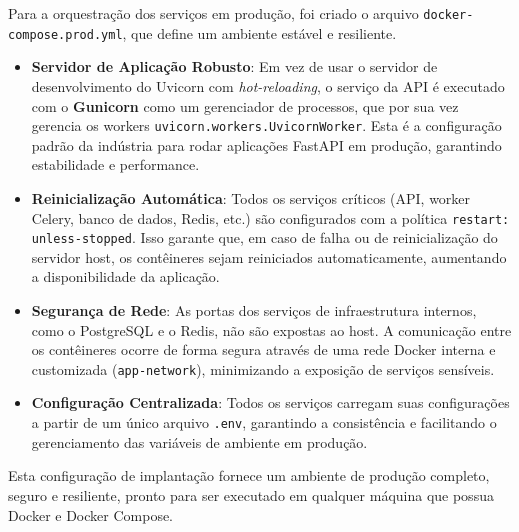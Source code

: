 Para a orquestração dos serviços em produção, foi criado o arquivo \texttt{docker-compose.prod.yml}, que define um ambiente estável e resiliente.

\begin{itemize}
    \item \textbf{Servidor de Aplicação Robusto}: Em vez de usar o servidor de desenvolvimento do Uvicorn com \textit{hot-reloading}, o serviço da API é executado com o \textbf{Gunicorn} como um gerenciador de processos, que por sua vez gerencia os workers \texttt{uvicorn.workers.UvicornWorker}. Esta é a configuração padrão da indústria para rodar aplicações FastAPI em produção, garantindo estabilidade e performance.
    
    \item \textbf{Reinicialização Automática}: Todos os serviços críticos (API, worker Celery, banco de dados, Redis, etc.) são configurados com a política \texttt{restart: unless-stopped}. Isso garante que, em caso de falha ou de reinicialização do servidor host, os contêineres sejam reiniciados automaticamente, aumentando a disponibilidade da aplicação.
    
    \item \textbf{Segurança de Rede}: As portas dos serviços de infraestrutura internos, como o PostgreSQL e o Redis, não são expostas ao host. A comunicação entre os contêineres ocorre de forma segura através de uma rede Docker interna e customizada (\texttt{app-network}), minimizando a exposição de serviços sensíveis.
    
    \item \textbf{Configuração Centralizada}: Todos os serviços carregam suas configurações a partir de um único arquivo \texttt{.env}, garantindo a consistência e facilitando o gerenciamento das variáveis de ambiente em produção.
\end{itemize}

Esta configuração de implantação fornece um ambiente de produção completo, seguro e resiliente, pronto para ser executado em qualquer máquina que possua Docker e Docker Compose.
